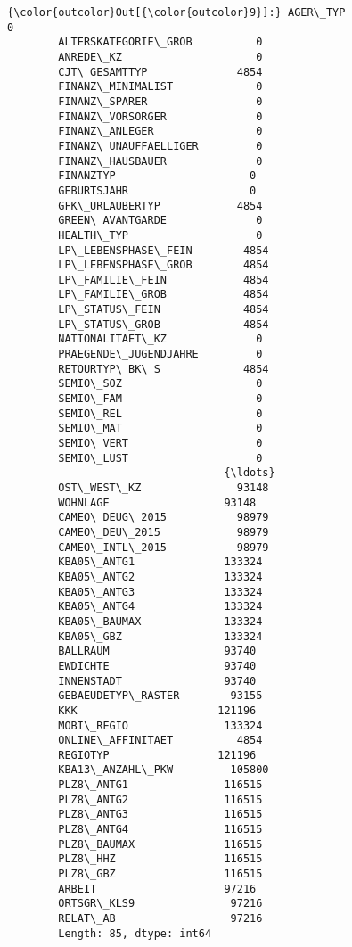 \documentclass[11pt]{article}
\begin{document}
\begin{Verbatim}[commandchars=\\\{\}]
{\color{outcolor}Out[{\color{outcolor}9}]:} AGER\_TYP                      0
        ALTERSKATEGORIE\_GROB          0
        ANREDE\_KZ                     0
        CJT\_GESAMTTYP              4854
        FINANZ\_MINIMALIST             0
        FINANZ\_SPARER                 0
        FINANZ\_VORSORGER              0
        FINANZ\_ANLEGER                0
        FINANZ\_UNAUFFAELLIGER         0
        FINANZ\_HAUSBAUER              0
        FINANZTYP                     0
        GEBURTSJAHR                   0
        GFK\_URLAUBERTYP            4854
        GREEN\_AVANTGARDE              0
        HEALTH\_TYP                    0
        LP\_LEBENSPHASE\_FEIN        4854
        LP\_LEBENSPHASE\_GROB        4854
        LP\_FAMILIE\_FEIN            4854
        LP\_FAMILIE\_GROB            4854
        LP\_STATUS\_FEIN             4854
        LP\_STATUS\_GROB             4854
        NATIONALITAET\_KZ              0
        PRAEGENDE\_JUGENDJAHRE         0
        RETOURTYP\_BK\_S             4854
        SEMIO\_SOZ                     0
        SEMIO\_FAM                     0
        SEMIO\_REL                     0
        SEMIO\_MAT                     0
        SEMIO\_VERT                    0
        SEMIO\_LUST                    0
                                  {\ldots}  
        OST\_WEST\_KZ               93148
        WOHNLAGE                  93148
        CAMEO\_DEUG\_2015           98979
        CAMEO\_DEU\_2015            98979
        CAMEO\_INTL\_2015           98979
        KBA05\_ANTG1              133324
        KBA05\_ANTG2              133324
        KBA05\_ANTG3              133324
        KBA05\_ANTG4              133324
        KBA05\_BAUMAX             133324
        KBA05\_GBZ                133324
        BALLRAUM                  93740
        EWDICHTE                  93740
        INNENSTADT                93740
        GEBAEUDETYP\_RASTER        93155
        KKK                      121196
        MOBI\_REGIO               133324
        ONLINE\_AFFINITAET          4854
        REGIOTYP                 121196
        KBA13\_ANZAHL\_PKW         105800
        PLZ8\_ANTG1               116515
        PLZ8\_ANTG2               116515
        PLZ8\_ANTG3               116515
        PLZ8\_ANTG4               116515
        PLZ8\_BAUMAX              116515
        PLZ8\_HHZ                 116515
        PLZ8\_GBZ                 116515
        ARBEIT                    97216
        ORTSGR\_KLS9               97216
        RELAT\_AB                  97216
        Length: 85, dtype: int64
\end{Verbatim}
            
\end{document}

